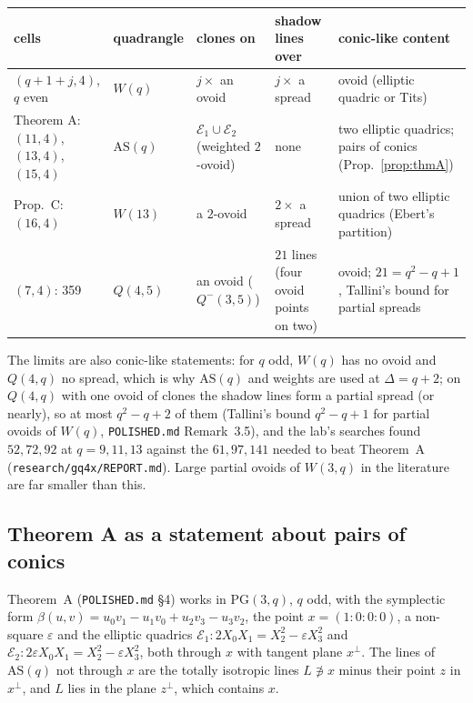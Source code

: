 \documentclass[11pt]{amsart}
\theoremstyle{definition}
\theoremstyle{remark}
\newcommand{\cE}{\mathcal{E}}
\newcommand{\PG}{\mathrm{PG}}
\begin{document}
\begin{center}\small
\begin{tabular}{@{}p{2.6cm}p{1.75cm}p{3.0cm}p{2.5cm}p{4.45cm}@{}}
\toprule
cells & quadrangle & clones on & shadow lines over & conic-like content \\
\midrule
$(q+1+j,4)$, $q$ even & $W(q)$ & $j\times$ an ovoid & $j\times$ a spread & ovoid (elliptic quadric or Tits) \\
Theorem A: $(11,4)$, $(13,4)$, $(15,4)$ & $\mathrm{AS}(q)$ & $\cE_1\cup\cE_2$ (weighted $2$-ovoid) & none
& two elliptic quadrics; pairs of conics (Prop.~\ref{prop:thmA}) \\
Prop.~C: $(16,4)$ & $W(13)$ & a $2$-ovoid & $2\times$ a spread & union of two elliptic quadrics (Ebert's partition) \\
$(7,4)$: 359 & $Q(4,5)$ & an ovoid ($Q^-(3,5)$) & $21$ lines (four ovoid points on two) & ovoid; $21=q^2-q+1$, Tallini's bound for partial spreads \\
\bottomrule
\end{tabular}
\end{center}

The limits are also conic-like statements: for $q$ odd, $W(q)$ has no ovoid and $Q(4,q)$ no spread, which is why
$\mathrm{AS}(q)$ and weights are used at $\Delta=q+2$; on $Q(4,q)$ with one ovoid of clones the shadow lines form a
partial spread (or nearly), so at most $q^2-q+2$ of them (Tallini's bound $q^2-q+1$ for partial ovoids of $W(q)$,
\texttt{POLISHED.md} Remark~3.5), and the lab's searches found $52,72,92$ at $q=9,11,13$ against the $61,97,141$ needed
to beat Theorem~A (\texttt{research/gq4x/REPORT.md}). Large partial ovoids of $W(3,q)$ in the literature
\cite{CDPS22} are far smaller than this.

\subsection{Theorem A as a statement about pairs of conics}
Theorem~A (\texttt{POLISHED.md} \S4) works in $\PG(3,q)$, $q$ odd, with the symplectic form
$\beta(u,v)=u_0v_1-u_1v_0+u_2v_3-u_3v_2$, the point $x=(1{:}0{:}0{:}0)$, a non-square $\varepsilon$ and the
elliptic quadrics $\cE_1: 2X_0X_1=X_2^2-\varepsilon X_3^2$ and $\cE_2: 2\varepsilon X_0X_1=X_2^2-\varepsilon X_3^2$,
both through $x$ with tangent plane $x^\perp$. The lines of $\mathrm{AS}(q)$ not through $x$ are the totally
isotropic lines $L\not\ni x$ minus their point $z$ in $x^\perp$, and $L$ lies in the plane $z^\perp$, which contains
$x$.
\end{document}
